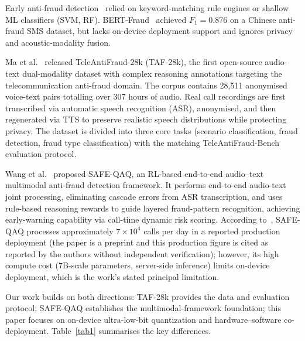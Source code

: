 \documentclass[11pt, a4paper]{article}
\begin{document}
Early anti-fraud detection~\cite{13,14,15} relied on keyword-matching rule engines or shallow ML classifiers (SVM, RF). BERT-Fraud~\cite{16} achieved $F_1 = 0.876$ on a Chinese anti-fraud SMS dataset, but lacks on-device deployment support and ignores privacy and acoustic-modality fusion.

Ma et al.~\cite{1} released TeleAntiFraud-28k (TAF-28k), the first open-source audio-text dual-modality dataset with complex reasoning annotations targeting the telecommunication anti-fraud domain. The corpus contains 28{,}511 anonymised voice-text pairs totalling over 307 hours of audio. Real call recordings are first transcribed via automatic speech recognition (ASR), anonymised, and then regenerated via TTS to preserve realistic speech distributions while protecting privacy. The dataset is divided into three core tasks (scenario classification, fraud detection, fraud type classification) with the matching TeleAntiFraud-Bench evaluation protocol.

Wang et al.~\cite{2} proposed SAFE-QAQ, an RL-based end-to-end audio--text multimodal anti-fraud detection framework. It performs end-to-end audio-text joint processing, eliminating cascade errors from ASR transcription, and uses rule-based reasoning rewards to guide layered fraud-pattern recognition, achieving early-warning capability via call-time dynamic risk scoring. According to~\cite{2}, SAFE-QAQ processes approximately $7\times10^4$ calls per day in a reported production deployment (the paper is a preprint and this production figure is cited as reported by the authors without independent verification); however, its high compute cost (7B-scale parameters, server-side inference) limits on-device deployment, which is the work's stated principal limitation.

Our work builds on both directions: TAF-28k provides the data and evaluation protocol; SAFE-QAQ establishes the multimodal-framework foundation; this paper focuses on on-device ultra-low-bit quantization and hardware--software co-deployment. Table~\ref{tab1} summarises the key differences.
\end{document}

